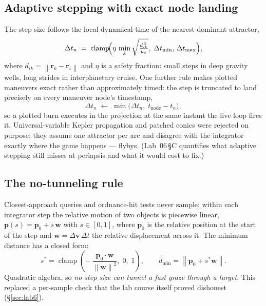 \documentclass[10pt,twocolumn]{article}
\newcommand{\dt}{\Delta t}
\newcommand{\norm}[1]{\left\lVert #1 \right\rVert}
\newcommand{\vect}[1]{\mathbf{#1}}
\begin{document}
\subsection{Adaptive stepping with exact node landing}

The step size follows the local dynamical time of the nearest dominant attractor,
\begin{equation}
\dt_n \;=\; \operatorname{clamp}\!\Bigl(
   \eta \,\min_k \sqrt{\tfrac{d_{ik}^{\,3}}{\mu_k}},\;
   \dt_{\min},\, \dt_{\max}\Bigr),
\label{eq:adaptive}
\end{equation}
where $d_{ik} = \norm{\vect{r}_k - \vect{r}_i}$ and $\eta$ is a safety fraction: small
steps in deep gravity wells, long strides in interplanetary cruise. One further rule makes
plotted maneuvers exact rather than approximately timed: the step is truncated to land
precisely on every maneuver node's timestamp,
\begin{equation}
\dt_n \;\leftarrow\; \min\bigl(\dt_n,\; t_{\text{node}} - t_n\bigr),
\end{equation}
so a plotted burn executes in the projection at the same instant the live loop fires it.
Universal-variable Kepler propagation and patched conics were rejected on purpose: they
assume one attractor per arc and disagree with the integrator exactly where the game
happens --- flybys. (Lab~06\,\S C quantifies what adaptive stepping still misses at
periapsis and what it would cost to fix.)

\subsection{The no-tunneling rule}
\label{sec:tunnel}

Closest-approach queries and ordnance-hit tests never sample: within each integrator step
the relative motion of two objects is piecewise linear,
$\vect{p}(s) = \vect{p}_0 + s\,\vect{w}$ with $s \in [0,1]$, where
$\vect{p}_0$ is the relative position at the start of the step and
$\vect{w} = \Delta\vect{v}\,\dt$ the relative displacement across it. The minimum distance
has a closed form:
\begin{equation}
s^\ast = \operatorname{clamp}\!\left(
  -\,\frac{\vect{p}_0 \cdot \vect{w}}{\norm{\vect{w}}^{2}},\; 0,\; 1\right),
\qquad
d_{\min} = \norm{\vect{p}_0 + s^\ast \vect{w}} .
\label{eq:notunnel}
\end{equation}
Quadratic algebra, so \emph{no step size can tunnel a fast graze through a target}. This
replaced a per-sample check that the lab course itself proved dishonest
(\S\ref{sec:lab6}).
\end{document}
